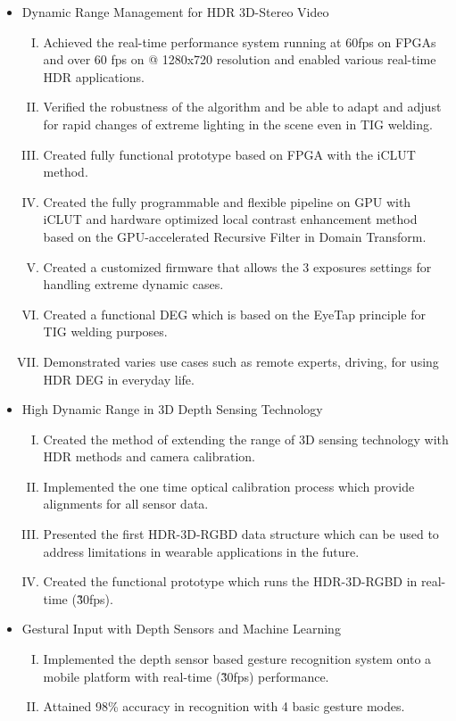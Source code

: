 \begin{itemize}
\item Dynamic Range Management for HDR 3D-Stereo Video
\begin{enumerate}[(I)]
\item Achieved the real-time performance system running at 60fps on FPGAs and over 60 fps on @ 1280x720 resolution and enabled various real-time HDR applications.
\item Verified the robustness of the algorithm and be able to adapt and adjust for rapid changes of extreme lighting in the scene even in TIG welding.  
\item Created fully functional prototype based on FPGA with the iCLUT method.
\item Created the fully programmable and flexible pipeline on GPU with iCLUT and hardware optimized local contrast enhancement method based on the GPU-accelerated Recursive Filter in Domain Transform.
\item Created a customized firmware that allows the 3 exposures settings for handling extreme dynamic cases.
\item Created a functional DEG which is based on the EyeTap principle for TIG welding purposes.
\item Demonstrated varies use cases such as remote experts, driving, for using HDR DEG in everyday life.
\end{enumerate}

\item High Dynamic Range in 3D Depth Sensing Technology
\begin{enumerate}[(I)]
\item Created the method of extending the range of 3D sensing technology with HDR methods and camera calibration.
\item Implemented the one time optical calibration process which provide alignments for all sensor data.
\item Presented the first HDR-3D-RGBD data structure which can be used to address limitations in wearable applications in the future.
\item Created the functional prototype which runs the HDR-3D-RGBD in real-time (\~30fps). 
\end{enumerate}

\item Gestural Input with Depth Sensors and Machine Learning
\begin{enumerate}[(I)]
\item Implemented the depth sensor based gesture recognition system onto a mobile platform with real-time (\~30fps) performance.
\item Attained 98\% accuracy in recognition with 4 basic gesture modes.
\end{enumerate}


\end{itemize}

